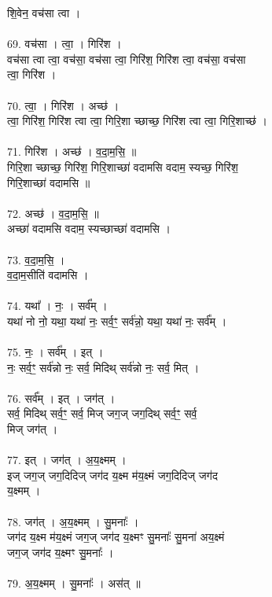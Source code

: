 शि॒वेन॒ वच॑सा त्वा ।\\
\\
69. वच॑सा । त्वा॒ । गिरि॑श ।\\
वच॑सा त्वा त्वा॒ वच॑सा॒ वच॑सा त्वा॒ गिरि॑श॒ गिरि॑श त्वा॒ वच॑सा॒ वच॑सा\\
त्वा॒ गिरि॑श ।\\
\\
70. त्वा॒ । गिरि॑श । अच्छ॑ ।\\
त्वा॒ गिरि॑श॒ गिरि॑श त्वा त्वा॒ गिरि॒शा च्छाच्छ॒ गिरि॑श त्वा त्वा॒ गिरि॒शाच्छ॑ ।\\
\\
71. गिरि॑श । अच्छ॑ । व॒दा॒म॒सि॒ ॥\\
गिरि॒शा च्छाच्छ॒ गिरि॑श॒ गिरि॒शाच्छा॑ वदामसि वदाम॒ स्यच्छ॒ गिरि॑श॒\\
गिरि॒शाच्छा॑ वदामसि ॥\\
\\
72. अच्छ॑ । व॒दा॒म॒सि॒ ॥\\
अच्छा॑ वदामसि वदाम॒ स्यच्छाच्छा॑ वदामसि ।\\
\\
73. व॒दा॒म॒सि॒ ।\\
व॒दा॒म॒सीति॑ वदामसि ।\\
\\
74. यथा᳚ । नः॒ । सर्व᳚म् ।\\
यथा॑ नो नो॒ यथा॒ यथा॑ नः॒ सर्व॒ꣳ॒ सर्व॑न्नो॒ यथा॒ यथा॑ नः॒ सर्व᳚म् ।\\
\\
75. नः॒ । सर्व᳚म् । इत् ।\\
नः॒ सर्व॒ꣳ॒ सर्व॑न्नो नः॒ सर्व॒ मिदिथ् सर्व॑न्नो नः॒ सर्व॒ मित् ।\\
\\
76. सर्व᳚म् । इत् । जग॑त् ।\\
सर्व॒ मिदिथ् सर्व॒ꣳ॒ सर्व॒ मिज् जग॒ज् जग॒दिथ् सर्व॒ꣳ॒ सर्व॒\\
मिज् जग॑त् ।\\
\\
77. इत् । जग॑त् । अ॒य॒क्ष्मम् ।\\
इज् जग॒ज् जग॒दिदिज् जग॑द य॒क्ष्म म॑य॒क्ष्मं जग॒दिदिज् जग॑द\\
य॒क्ष्मम् ।\\
\\
78. जग॑त् । अ॒य॒क्ष्मम् । सु॒मनाः᳚ ।\\
जग॑द य॒क्ष्म म॑य॒क्ष्मं जग॒ज् जग॑द य॒क्ष्मꣳ सु॒मनाः᳚ सु॒मना॑ अय॒क्ष्मं\\
जग॒ज् जग॑द य॒क्ष्मꣳ सु॒मनाः᳚ ।\\
\\
79. अ॒य॒क्ष्मम् । सु॒मनाः᳚ । अस॑त् ॥\\
